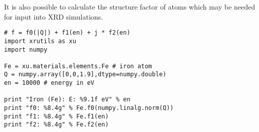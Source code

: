 It is also possible to calculate the structure factor of atoms which may be needed for input into XRD simulations.

\begin{lstlisting}[caption=components of the structure factor for simulations]
# f = f0(|Q|) + f1(en) + j * f2(en)
import xrutils as xu
import numpy

Fe = xu.materials.elements.Fe # iron atom
Q = numpy.array([0,0,1.9],dtype=numpy.double)
en = 10000 # energy in eV

print "Iron (Fe): E: %9.1f eV" % en
print "f0: %8.4g" % Fe.f0(numpy.linalg.norm(Q))
print "f1: %8.4g" % Fe.f1(en)
print "f2: %8.4g" % Fe.f2(en)
\end{lstlisting}


